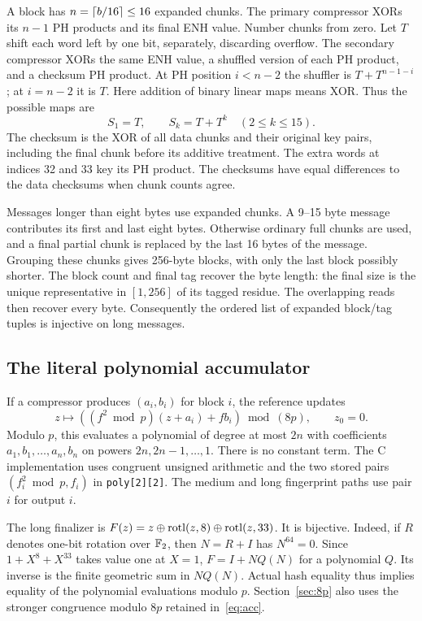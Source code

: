 A block has $n=\left\lceil b/16\right\rceil\le16$ expanded chunks. The primary compressor XORs its $n-1$ PH products and its final ENH value. Number chunks from zero. Let $T$ shift each word left by one bit, separately, discarding overflow. The secondary compressor XORs the same ENH value, a shuffled version of each PH product, and a checksum PH product. At PH position $i<n-2$ the shuffler is $T+T^{n-1-i}$; at $i=n-2$ it is $T$. Here addition of binary linear maps means XOR. Thus the possible maps are
\begin{equation}\label{eq:shufflers}
 S_1=T,\qquad S_k=T+T^k\quad(2\le k\le15).
\end{equation}
The checksum is the XOR of all data chunks and their original key pairs, including the final chunk before its additive treatment. The extra words at indices 32 and 33 key its PH product. The checksums have equal differences to the data checksums when chunk counts agree.

Messages longer than eight bytes use expanded chunks. A 9--15 byte message contributes its first and last eight bytes. Otherwise ordinary full chunks are used, and a final partial chunk is replaced by the last 16 bytes of the message. Grouping these chunks gives 256-byte blocks, with only the last block possibly shorter. The block count and final tag recover the byte length: the final size is the unique representative in $[1,256]$ of its tagged residue. The overlapping reads then recover every byte. Consequently the ordered list of expanded block/tag tuples is injective on long messages.

\subsection{The literal polynomial accumulator}
If a compressor produces $(a_i,b_i)$ for block $i$, the reference updates
\begin{equation}\label{eq:acc}
 z\longmapsto ((f^2\bmod p)(z+a_i)+fb_i)\bmod(8p),\qquad z_0=0.
\end{equation}
Modulo $p$, this evaluates a polynomial of degree at most $2n$ with coefficients $a_1,b_1,\ldots,a_n,b_n$ on powers $2n,2n-1,\ldots,1$. There is no constant term. The C implementation uses congruent unsigned arithmetic and the two stored pairs $(f_i^2\bmod p,f_i)$ in \texttt{poly[2][2]}. The medium and long fingerprint paths use pair $i$ for output $i$.

The long finalizer is $F(z)=z\mathbin\oplus\operatorname{rotl}(z,8)\mathbin\oplus\operatorname{rotl}(z,33)$. It is bijective. Indeed, if $R$ denotes one-bit rotation over $\mathbb F_2$, then $N=R+I$ has $N^{64}=0$. Since $1+X^8+X^{33}$ takes value one at $X=1$, $F=I+NQ(N)$ for a polynomial $Q$. Its inverse is the finite geometric sum in $NQ(N)$. Actual hash equality thus implies equality of the polynomial evaluations modulo $p$. Section~\ref{sec:8p} also uses the stronger congruence modulo $8p$ retained in~\eqref{eq:acc}.

